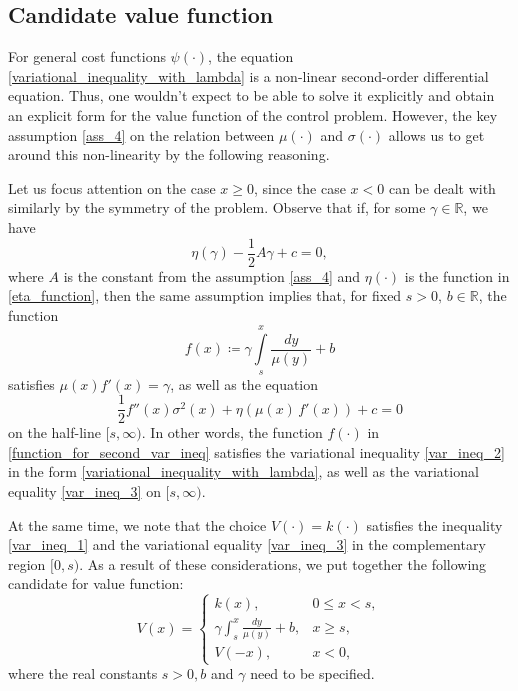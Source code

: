 \documentclass[11pt,tbtags,reqno]{article}
\theoremstyle{definition}
\numberwithin{equation}{section}
\theoremstyle{definition}
\begin{document}
\subsection{Candidate value function}

For general cost functions $\psi(\cdot)$, the equation \eqref{variational_inequality_with_lambda} is a non-linear second-order differential equation. Thus, one wouldn't expect to be able to solve it explicitly and obtain an explicit form for the value function of the control problem. However, the key assumption \ref{ass_4} on the relation between $\mu(\cdot)$ and $\sigma(\cdot)$ allows us to get around this non-linearity by the following reasoning.

Let us focus attention on the case $x \ge 0$, since the case $x < 0$ can be dealt with similarly by the symmetry of the problem. Observe that if, for some $\gamma \in \mathbb{R}$, we have 
\begin{equation}\label{equation_on_clope}
    \eta(\gamma) - \frac{1}{2}A\gamma + c = 0,
\end{equation}
where $A$ is the constant from the assumption \ref{ass_4} and $\eta(\cdot)$ is the function in \eqref{eta_function}, then the same assumption implies that, for fixed $s > 0, \, b \in \mathbb{R}$, the function 
\begin{equation}\label{function_for_second_var_ineq}
    f(x) \coloneqq \gamma \int\limits_s^x \frac{dy}{\mu(y)} + b
\end{equation}
satisfies $\mu(x) f'(x) = \gamma$, as well as the equation
\begin{equation}
    \frac{1}{2}f''(x)\sigma^2(x) + \eta(\mu(x) \, f'(x)) + c = 0
\end{equation}
on the half-line $[s, \infty)$.
In other words, the function $f(\cdot)$ in \eqref{function_for_second_var_ineq} satisfies the variational inequality \ref{var_ineq_2} in the form \eqref{variational_inequality_with_lambda}, as well as the variational equality \ref{var_ineq_3} on $[s, \infty)$. 

At the same time, we note that the choice $V(\cdot) = k(\cdot)$ satisfies the inequality \ref{var_ineq_1} and the variational equality \ref{var_ineq_3} in the complementary region $[0, s)$. As a result of these considerations, we put together the following candidate for value function:
\begin{equation}\label{value_function_candidate}
    V(x) = 
    \begin{cases}
        k(x),  & 0 \leq x < s, \\
        \gamma \int_s^x \frac{dy}{\mu(y)} + b, & x \ge s, \\
        V(-x),  & x<0,
    \end{cases}
\end{equation}
where the real constants $s > 0, b$ and $\gamma$ need to be specified. 
\end{document}
